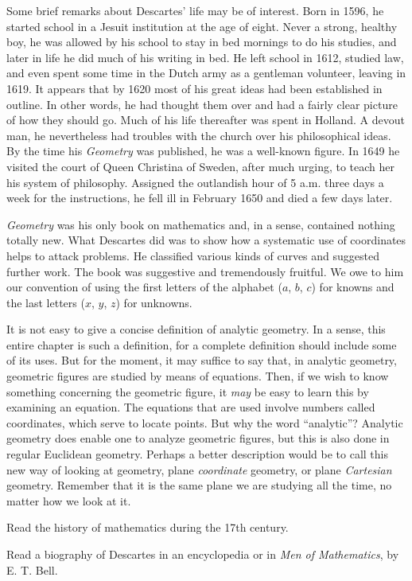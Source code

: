 \documentclass[11pt]{book}
\theoremstyle{bkplain}
\theoremstyle{XIplainnote}
\theoremstyle{bkplain}
\theoremstyle{bkplain}
\begin{document}
Some brief remarks about Descartes' life may be of interest. Born in 1596, he
started school in a Jesuit institution at the age of eight. Never a strong,
healthy boy, he was allowed by his school to stay in bed mornings to do his
studies, and later in life he did much of his writing in bed. He left school
in 1612, studied law, and even spent some time in the Dutch army as a
gentleman volunteer, leaving in 1619. It appears that by 1620 most of his
great ideas had been established in outline. In other words, he had thought
them over and had a fairly clear picture of how they should go. Much of his
life thereafter was spent in Holland. A devout man, he nevertheless had
troubles with the church over his philosophical ideas. By the time his
\emph{Geometry} was published, he was a well-known figure. In 1649 he visited
the court of Queen Christina of Sweden, after much urging, to teach her his
system of philosophy. Assigned the outlandish hour of 5 a.m. three days a week
for the instructions, he fell ill in February 1650 and died a few days later.

\emph{Geometry} was his only book on mathematics and, in a sense, contained
nothing totally new. What Descartes did was to show how a systematic use of
coordinates helps to attack problems. He classified various kinds of curves
and suggested further work. The book was suggestive and tremendously fruitful.
We owe to him our convention of using the first letters of the alphabet
($a$, $b$, $c$) for knowns and the last letters ($x$, $y$, $z$) for unknowns.

It is not easy to give a concise definition of analytic geometry. In a sense,
this entire chapter is such a definition, for a complete definition should
include some of its uses. But for the moment, it may suffice to say that, in
analytic geometry, geometric figures are studied by means of equations. Then,
if we wish to know something concerning the geometric figure, it \emph{may} be
easy to learn this by examining an equation. The equations that are used
involve numbers called coordinates, which serve to locate points. But why the
word ``analytic''? Analytic geometry does enable one to analyze geometric
figures, but this is also done in regular Euclidean geometry. Perhaps a better
description would be to call this new way of looking at geometry, plane
\emph{coordinate} geometry, or plane \emph{Cartesian} geometry. Remember that
it is the same plane we are studying all the time, no matter how we look at it.

\begin{exercisecols}
\begin{exlist}
\item Read the history of mathematics during the 17th century.
\item Read a biography of Descartes in an encyclopedia or in \emph{Men of
  Mathematics}, by E. T. Bell.
\end{exlist}
\end{exercisecols}
\end{document}
